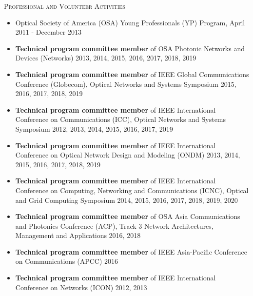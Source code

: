 \documentclass[letterpaper,11pt]{article}
\newcommand{\resheading}[1]{{\noindent\large \colorbox{mygrey}{
\begin{minipage}{1.0\textwidth}{\textsc{#1 \vphantom{p\^{E}}}}\end{minipage}}}}
\begin{document}
\leftskip 0.0cm
\vspace{0.1in}
\resheading{Professional and Volunteer Activities}%
\begin{itemize}
\setlength{\itemindent}{-0.075in}


\item
Optical Society of America (OSA) Young Professionals (YP) Program, April 2011 - December 2013

\item
\textbf{Technical program committee member} of OSA Photonic Networks and Devices (Networks) 2013, 2014, 2015, 2016, 2017, 2018, 2019

\item
\textbf{Technical program committee member} of IEEE Global Communications Conference (Globecom), Optical Networks and Systems Symposium 2015, 2016, 2017,
2018, 2019

\item
\textbf{Technical program committee member} of IEEE International Conference on Communications (ICC), Optical Networks and Systems Symposium
2012, 2013, 2014, 2015, 2016, 2017, 2019

\item
\textbf{Technical program committee member} of IEEE International Conference on Optical Network Design and Modeling (ONDM)
2013, 2014, 2015, 2016, 2017, 2018, 2019

\item
\textbf{Technical program committee member} of IEEE International Conference on Computing, Networking and Communications (ICNC),
Optical and Grid Computing Symposium 2014, 2015, 2016, 2017, 2018, 2019, 2020

\item
\textbf{Technical program committee member} of OSA Asia Communications and Photonics Conference (ACP),
Track 3 Network Architectures, Management and Applications 2016, 2018

\item
\textbf{Technical program committee member} of IEEE Asia-Pacific Conference on Communications (APCC) 2016

\item
\textbf{Technical program committee member} of IEEE International Conference on Networks (ICON) 2012, 2013


\end{itemize}
\end{document}
